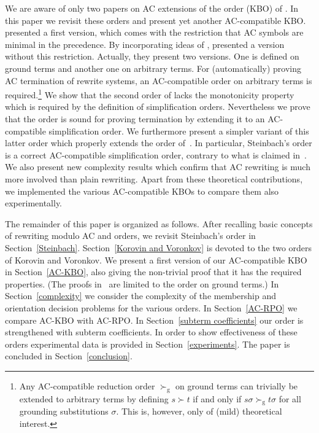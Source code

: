 \documentclass{tlp}
\newcommand{\GT}{\mathrel{\succ}}
\begin{document}
We are aware of only two papers on AC extensions of the order (KBO) of 
.
In this paper we revisit these orders and
present yet another AC-compatible KBO.
 presented
a first version, which comes with the restriction that AC symbols are
minimal in the precedence. By incorporating ideas of \cite{R02},
 presented a version without this restriction.
Actually, they present two versions. One is defined on ground terms
and another one on arbitrary terms. For (automatically) proving
AC termination of rewrite systems,
an AC-compatible order on arbitrary terms is required.\footnote{Any AC-compatible reduction order $\GT_\mathrm{g}$ on ground
terms can trivially be extended to
arbitrary terms by defining $s \GT t$ if and only if
$s\sigma \GT_\mathrm{g} t\sigma$ for all grounding substitutions $\sigma$.
This is, however, only of (mild) theoretical interest.}
We show that the second order of  lacks the
monotonicity property which is required by the definition of
simplification orders.
Nevertheless we prove that the order is sound for
proving termination by extending it to an AC-compatible
simplification order.
We furthermore present a simpler variant of this latter order which
properly extends the order of~.
In particular, Steinbach's order is a correct
AC-compatible simplification order, contrary to what is claimed
in~\cite{KV03b}.
We also present new complexity results which confirm that
AC rewriting is much more involved than plain rewriting.
Apart from these theoretical contributions, we implemented the
various AC-compatible KBOs to compare them also experimentally.

The remainder of this paper is organized as follows. After
recalling basic concepts of rewriting modulo AC and orders,
we revisit Steinbach's order in Section~\ref{Steinbach}.
Section~\ref{Korovin and Voronkov} is devoted to the two orders of
Korovin and Voronkov. We present a first version of our AC-compatible KBO
in Section~\ref{AC-KBO}, 
also giving the non-trivial proof that
it has the required properties. (The proofs in~\cite{KV03b} are limited
to the order on ground terms.)
In Section~\ref{complexity} we consider the complexity of the
membership and orientation decision problems for the various orders.
In Section~\ref{AC-RPO} we compare AC-KBO with AC-RPO.
In Section~\ref{subterm coefficients} our order is strengthened
with subterm coefficients.
In order to show effectiveness of these orders
experimental data is provided in Section~\ref{experiments}.
The paper is concluded in Section~\ref{conclusion}.
\end{document}
